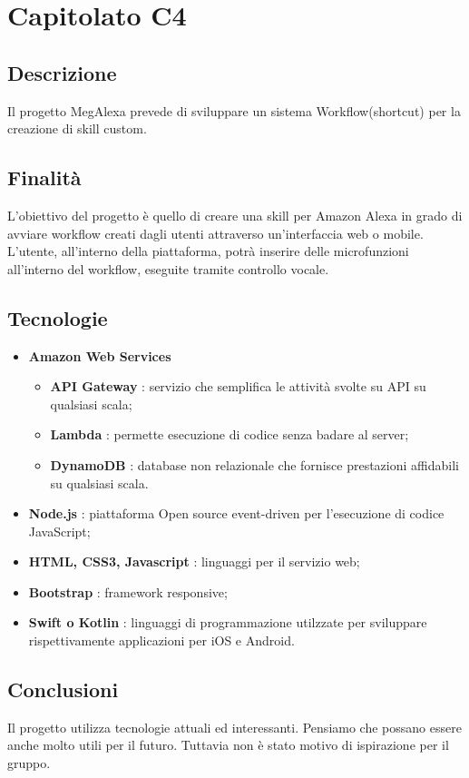 \section{Capitolato C4}
	\subsection{Descrizione}
		Il progetto MegAlexa prevede di sviluppare un sistema Workflow(shortcut) per la creazione di skill custom.
	\subsection{Finalità}
		L'obiettivo del progetto è quello di creare una skill per Amazon Alexa in grado di avviare workflow creati dagli utenti attraverso un'interfaccia web o mobile.
		L'utente, all'interno della piattaforma, potrà inserire delle microfunzioni all'interno del workflow, eseguite tramite controllo vocale.
	\subsection{Tecnologie}
		\begin{itemize}
			\item \textbf{Amazon Web Services}
				\begin{itemize}
					\item \textbf{API Gateway} : servizio che semplifica le attività svolte su API su qualsiasi scala;
					\item \textbf{Lambda} : permette esecuzione di codice senza badare al server;
					\item \textbf{DynamoDB} : database non relazionale che fornisce prestazioni affidabili su qualsiasi scala.
				\end{itemize}
			\item \textbf{Node.js} : piattaforma Open source event-driven per l'esecuzione di codice JavaScript;
			\item \textbf{HTML, CSS3, Javascript} : linguaggi per il servizio web;
			\item \textbf{Bootstrap} : framework responsive;
			\item \textbf{Swift o Kotlin} : linguaggi di programmazione utilzzate per sviluppare rispettivamente applicazioni per iOS e Android.
		\end{itemize}
	\subsection{Conclusioni}
		Il progetto utilizza tecnologie attuali ed interessanti. Pensiamo che possano essere anche molto utili per il futuro. Tuttavia non è stato motivo di ispirazione per il gruppo.